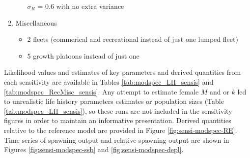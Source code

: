 \documentclass[11pt,
  english,
  a4paper,
]{article}
\begin{document}
\begin{enumerate}
\begin{itemize}
    {\(\sigma_R\)\leavevmode\tagmcend\tagstructend} = 0.6 with no extra variance

    \tagmcend\tagstructend\tagstructend

    \tagmcend\tagstructend\tagstructend
  \end{itemize}

  \tagstructend
\item

  Miscellaneous

  \tagmcend\tagstructend\tagstructend


  \begin{itemize}
  \item


    2 fleets (commerical and recreational instead of just one lumped fleet)

    \tagmcend\tagstructend\tagstructend

    \tagmcend\tagstructend\tagstructend
  \item


    5 growth platoons instead of just one

    \tagmcend\tagstructend\tagstructend

    \tagmcend\tagstructend\tagstructend
  \end{itemize}

  \tagstructend
\end{enumerate}

\tagstructend


Likelihood values and estimates of key parameters and derived quantities from each sensitivity are available in Tables \ref{tab:modspec_LH_sensis} and \ref{tab:modspec_RecMisc_sensis}. Any attempt to estimate female {\(M\)\leavevmode\tagmcend\tagstructend} and or {\(k\)\leavevmode\tagmcend\tagstructend} led to unrealistic life history parameters estimates or population sizes (Table \ref{tab:modspec_LH_sensis}), so these runs are not included in the sensitivity figures in order to maintain an informative presentation. Derived quantities relative to the reference model are provided in Figure \ref{fig:sensi-modspec-RE}. Time series of spawning output and relative spawning output are shown in Figures \ref{fig:sensi-modspec-ssb} and \ref{fig:sensi-modspec-depl}.
\end{document}

